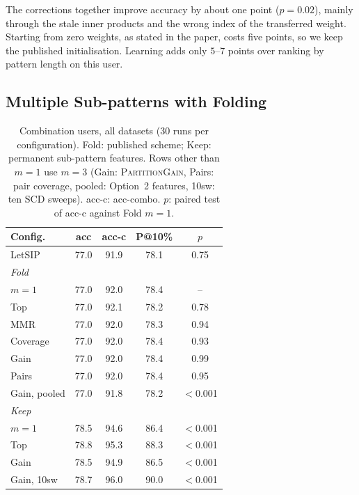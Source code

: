 \documentclass[sigconf]{acmart}
\begin{document}
The corrections together improve accuracy by about one point ($p = 0.02$), mainly through the stale inner products and the wrong index of the transferred weight. Starting from zero weights, as stated in the paper, costs five points, so we keep the published initialisation. Learning adds only $5$--$7$ points over ranking by pattern length on this user.

\subsection{Multiple Sub-patterns with Folding}
\label{subsec:main_results}

\begin{table}[t]
\centering
\caption{Combination users, all datasets (30 runs per configuration). Fold: published scheme; Keep:
permanent sub-pattern features. Rows other than $m{=}1$ use $m = 3$ (Gain:
\textsc{PartitionGain}, Pairs: pair coverage, pooled: Option~2 features, 10sw: ten SCD sweeps). acc-c: acc-combo. $p$: paired test of
acc-c against Fold $m{=}1$.}
\label{tab:main}
\small
\setlength{\tabcolsep}{4pt}
\begin{tabular}{lcccc}
\toprule
Config. & acc & acc-c & P@10\% & $p$ \\
\midrule
LetSIP              & 77.0 & 91.9 & 78.1 & 0.75 \\
\multicolumn{5}{l}{\emph{Fold}} \\
\quad $m{=}1$       & 77.0 & 92.0 & 78.4 & --   \\
\quad Top           & 77.0 & 92.1 & 78.2 & 0.78 \\
\quad MMR           & 77.0 & 92.0 & 78.3 & 0.94 \\
\quad Coverage      & 77.0 & 92.0 & 78.4 & 0.93 \\
\quad Gain          & 77.0 & 92.0 & 78.4 & 0.99 \\
\quad Pairs         & 77.0 & 92.0 & 78.4 & 0.95 \\
\quad Gain, pooled  & 77.0 & 91.8 & 78.2 & $<$0.001 \\
\multicolumn{5}{l}{\emph{Keep}} \\
\quad $m{=}1$       & 78.5 & 94.6 & 86.4 & $<$0.001 \\
\quad Top           & 78.8 & 95.3 & 88.3 & $<$0.001 \\
\quad Gain          & 78.5 & 94.9 & 86.5 & $<$0.001 \\
\quad Gain, 10sw    & 78.7 & 96.0 & 90.0 & $<$0.001 \\
\bottomrule
\end{tabular}
\end{table}
\end{document}
